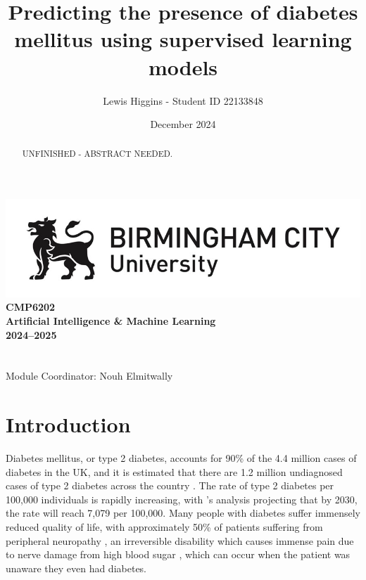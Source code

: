 \documentclass[12pt]{report}
\title{Predicting the presence of diabetes mellitus using supervised learning models}
\author{Lewis Higgins - Student ID 22133848}
\date{December 2024}
\begin{document}
\makeatletter
\begin{titlepage}
    \begin{center}
        \includegraphics[width=.8\linewidth]{BCU-Long.jpg}\\[4ex]
        {\huge \bfseries CMP6202}\\[4ex]
        {\huge \bfseries Artificial Intelligence \& Machine Learning}\\[4ex]
        {\huge \bfseries 2024–2025}\\[16ex]
        {\huge \bfseries  \@title}\\[40ex]
        {\@author}\\[2ex]
        {Module Coordinator: Nouh Elmitwally}\\[10ex]
    \end{center}
\end{titlepage}
\makeatother
\thispagestyle{empty}
\newpage


\setcounter{page}{0}


\tableofcontents
\thispagestyle{empty}

\pagecolor{yellow}
\begin{abstract}
    UNFINISHED - ABSTRACT NEEDED.
\end{abstract}
\pagecolor{white}

\chapter{Introduction}

Diabetes mellitus, or type 2 diabetes, accounts for 90\% of the 4.4 million cases of diabetes in the UK, and it is estimated that 
there are 1.2 million undiagnosed cases of type 2 diabetes across the country \autocite{diabetes_uk_how_nodate}. The rate of type 
2 diabetes per 100,000 individuals is rapidly increasing, with \textcite{khan_epidemiology_2020}'s analysis projecting that by 
2030, the rate will reach 7,079 per 100,000. Many people with diabetes suffer immensely reduced quality of life, with approximately 50\% 
of patients suffering from peripheral neuropathy \autocite{dhanapalaratnam_effect_2024}, an irreversible disability which causes immense pain due 
to nerve damage from high blood sugar \autocite{nhs_peripheral_2022}, which can occur when the patient was unaware they even 
had diabetes. 
\end{document}

